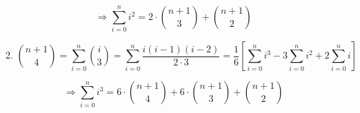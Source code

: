 \documentclass[10pt]{article}
\begin{document}
\begin{enumerate}[label*=2.\arabic*]
\begin{enumerate}
	$$\Rightarrow \sum_{i=0}^n {i^2} = 2 \cdot \binom{n+1}{3} + \binom{n+1}{2}$$
	
	\item $$\binom{n+1}{4} = \sum_{i=0}^n \binom{i}{3} = \sum_{i=0}^n \frac{i(i-1)(i-2)}{2 \cdot 3} = \frac{1}{6} \left[ \sum_{i=0}^n {i^3} - 3 \sum_{i=0}^n {i^2} + 2 \sum_{i=0}^n {i} \right]$$
	
	$$\Rightarrow \sum_{i=0}^n {i^3} = 6 \cdot \binom{n+1}{4} + 6 \cdot \binom{n+1}{3} + \binom{n+1}{2} $$
	\end{enumerate}
\end{enumerate}
\end{document}
